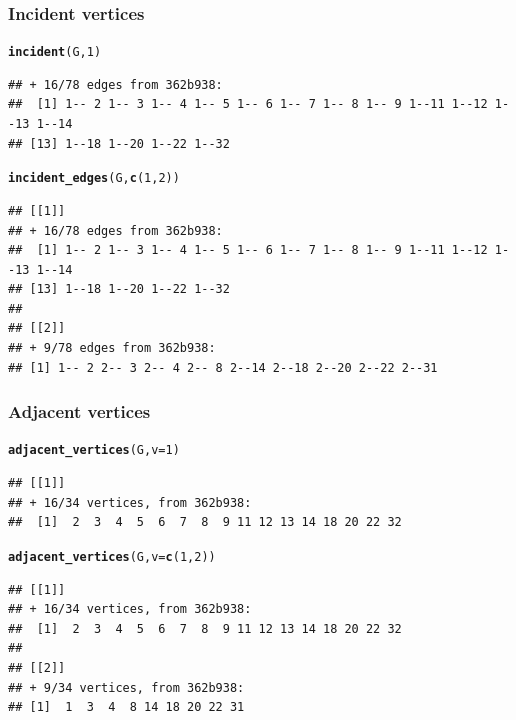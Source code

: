 \documentclass[aspectratio=169]{beamer}\usepackage[]{graphicx}\usepackage[]{xcolor}
\makeatletter
\newcommand{\hlnum}[1]{\textcolor[rgb]{0.686,0.059,0.569}{#1}}%
\newcommand{\hldef}[1]{\textcolor[rgb]{0.345,0.345,0.345}{#1}}%
\newcommand{\hlkwc}[1]{\textcolor[rgb]{0.333,0.667,0.333}{#1}}%
\newcommand{\hlkwd}[1]{\textcolor[rgb]{0.737,0.353,0.396}{\textbf{#1}}}%
\newenvironment{kframe}{%
 \def\at@end@of@kframe{}%
 \ifinner\ifhmode%
  \def\at@end@of@kframe{\end{minipage}}%
  \begin{minipage}{\columnwidth}%
 \fi\fi%
 \def\FrameCommand##1{\hskip\@totalleftmargin \hskip-\fboxsep
 \colorbox{shadecolor}{##1}\hskip-\fboxsep
     \hskip-\linewidth \hskip-\@totalleftmargin \hskip\columnwidth}%
 \MakeFramed {\advance\hsize-\width
   \@totalleftmargin\z@ \linewidth\hsize
   \@setminipage}}%
 {\par\unskip\endMakeFramed%
 \at@end@of@kframe}
\newenvironment{knitrout}{}{} %
\makeatother
\begin{document}
\begin{frame}[fragile]\frametitle{Incident vertices}
\begin{knitrout}
\color{fgcolor}\begin{kframe}
\begin{alltt}
\hlkwd{incident}\hldef{(G,} \hlnum{1}\hldef{)}
\end{alltt}
\begin{verbatim}
## + 16/78 edges from 362b938:
##  [1] 1-- 2 1-- 3 1-- 4 1-- 5 1-- 6 1-- 7 1-- 8 1-- 9 1--11 1--12 1--13 1--14
## [13] 1--18 1--20 1--22 1--32
\end{verbatim}
\begin{alltt}
\hlkwd{incident_edges}\hldef{(G,} \hlkwd{c}\hldef{(}\hlnum{1}\hldef{,} \hlnum{2}\hldef{))}
\end{alltt}
\begin{verbatim}
## [[1]]
## + 16/78 edges from 362b938:
##  [1] 1-- 2 1-- 3 1-- 4 1-- 5 1-- 6 1-- 7 1-- 8 1-- 9 1--11 1--12 1--13 1--14
## [13] 1--18 1--20 1--22 1--32
## 
## [[2]]
## + 9/78 edges from 362b938:
## [1] 1-- 2 2-- 3 2-- 4 2-- 8 2--14 2--18 2--20 2--22 2--31
\end{verbatim}
\end{kframe}
\end{knitrout}
\end{frame}

\begin{frame}[fragile]\frametitle{Adjacent vertices}
\begin{knitrout}
\color{fgcolor}\begin{kframe}
\begin{alltt}
\hlkwd{adjacent_vertices}\hldef{(G,} \hlkwc{v} \hldef{=} \hlnum{1}\hldef{)}
\end{alltt}
\begin{verbatim}
## [[1]]
## + 16/34 vertices, from 362b938:
##  [1]  2  3  4  5  6  7  8  9 11 12 13 14 18 20 22 32
\end{verbatim}
\begin{alltt}
\hlkwd{adjacent_vertices}\hldef{(G,} \hlkwc{v} \hldef{=} \hlkwd{c}\hldef{(}\hlnum{1}\hldef{,} \hlnum{2}\hldef{))}
\end{alltt}
\begin{verbatim}
## [[1]]
## + 16/34 vertices, from 362b938:
##  [1]  2  3  4  5  6  7  8  9 11 12 13 14 18 20 22 32
## 
## [[2]]
## + 9/34 vertices, from 362b938:
## [1]  1  3  4  8 14 18 20 22 31
\end{verbatim}
\end{kframe}
\end{knitrout}
\end{frame}
\end{document}
